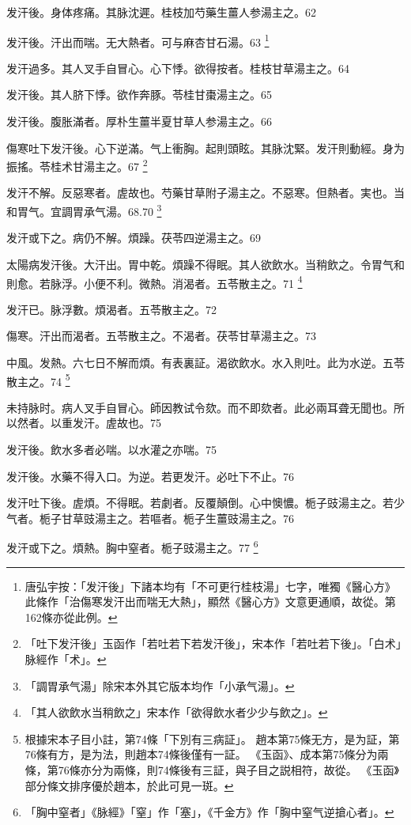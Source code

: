 发汗後。身体疼痛。其脉沈遲。桂枝加芍藥生薑人参湯主之。62

发汗後。汗出而喘。无大熱者。可与麻杏甘石湯。63
	\footnote{
		唐弘宇按：「发汗後」下諸本均有「不可更行桂枝湯」七字，唯獨《醫心方》此條作「治傷寒发汗出而喘无大熱」，顯然《醫心方》文意更通順，故從。第162條亦從此例。
	}

发汗過多。其人叉手自冒心。心下悸。欲得按者。桂枝甘草湯主之。64

发汗後。其人脐下悸。欲作奔豚。苓桂甘棗湯主之。65

发汗後。腹胀滿者。厚朴{\khaaitp 生薑半夏甘草人参}湯主之。66

傷寒吐下发汗後。心下逆滿。气上衝胸。起則頭眩。其脉沈緊。发汗則動經。身为振搖。苓桂术甘湯主之。67
	\footnote{
		「吐下发汗後」玉函作「若吐若下若发汗後」，宋本作「若吐若下後」。「白术」脉經作「术」。
	}

发汗不解。反惡寒者。虗故也。芍藥甘草附子湯主之。不惡寒。但熱者。実也。当和胃气。宜調胃承气湯。68.70
	\footnote{
		「調胃承气湯」除宋本外其它版本均作「小承气湯」。
	}

发汗或下之。{\khaaitp 病仍}不解。煩躁。茯苓四逆湯主之。69

太陽病发汗後。大汗出。胃中乾。煩躁不得眠。其人欲飲水。当稍飲之。令胃气和則愈。若脉浮。小便不利。微熱。消渴者。五苓散主之。71
	\footnote{
		「其人欲飲水当稍飲之」宋本作「欲得飲水者少少与飲之」。
	}

发汗已。脉浮數。煩渴者。五苓散主之。72

傷寒。汗出而渴者。五苓散主之。不渴者。茯苓甘草湯主之。73

中風。发熱。六七日不解而煩。有表裏証。渴欲飲水。水入則吐。此为水逆。五苓散主之。74
	\footnote{
		根據宋本子目小註，第74條「下別有三病証」。
		趙本第75條无方，是为証，第76條有方，是为法，則趙本74條後僅有一証。
		《玉函》、成本第75條分为兩條，第76條亦分为兩條，則74條後有三証，與子目之説相符，故從。
		《玉函》部分條文排序優於趙本，於此可見一斑。
	}

未持脉时。病人叉手自冒心。師因教试令欬。而不即欬者。此必兩耳聋无聞也。所以然者。以重发汗。虗故也。75

发汗後。飲水多者必喘。以水灌之亦喘。75

发汗後。水藥不得入口。为逆。{\khaaitp 若更发汗。必吐下不止。}76

发汗吐下後。虗煩。不得眠。若劇者。反覆顛倒。心中懊憹。栀子{\khaaitp 豉}湯主之。若少气者。栀子甘草{\khaaitp 豉}湯主之。若嘔者。栀子生薑{\khaaitp 豉}湯主之。76

发汗或下之。煩熱。胸中窒者。栀子{\khaaitp 豉}湯主之。77
	\footnote{
		「胸中窒者」《脉經》「窒」作「塞」，《千金方》作「胸中窒气逆搶心者」。
	}

